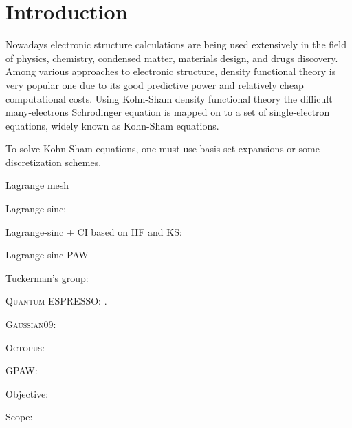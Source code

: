 \section{Introduction}

Nowadays electronic structure calculations are being used extensively in the field of
physics, chemistry, condensed matter, materials design, and drugs discovery.
Among various approaches to electronic structure, density functional theory
\cite{Hohenberg1964} is very popular one due to its good predictive
power and relatively cheap computational costs.
Using Kohn-Sham density functional theory \cite{Kohn1965} the difficult many-electrons
Schrodinger equation is mapped on to a set of single-electron equations, widely known
as Kohn-Sham equations.

To solve Kohn-Sham equations, one must use basis set expansions or some discretization
schemes.

Lagrange mesh \cite{Baye2015}

Lagrange-sinc: \cite{Choi2015,Choi2016}

Lagrange-sinc + CI based on HF and KS: \cite{Kim2015}

Lagrange-sinc PAW \cite{Kang2016}

Tuckerman's group: \cite{HeeSeungLee2006,HeeSeungLee2006,HeeSeungLee2008}

\textsc{Quantum ESPRESSO}: \cite{Giannozzi2009,Giannozzi2017}.

\textsc{Gaussian09}: \cite{Gaussian2009}

\textsc{Octopus}: \cite{Marques2003,Castro2006,Xavier2015}

GPAW: \cite{Enkovaara2010}

Objective:

Scope: